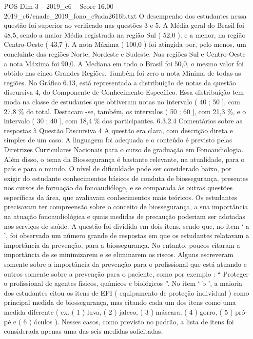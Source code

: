 \begin{textsample}{POS Dim 3 – 2019\_c6 – Score 16.00 – 2019\_c6/enade\_2019\_fono\_e9ada2616b.txt}
O desempenho dos estudantes nessa questão foi superior ao verificado nas questões 3 e 5.
A Média geral do Brasil foi 48,5, sendo a maior Média registrada na região Sul ( 52,0 ), e a menor, na região Centro-Oeste ( 43,7 ).
A nota Máxima ( 100,0 ) foi atingida por, pelo menos, um concluinte das regiões Norte, Nordeste e Sudeste.
Nas regiões Sul e Centro-Oeste a nota Máxima foi 90,0.
A Mediana em todo o Brasil foi 50,0, o mesmo valor foi obtido nas cinco Grandes Regiões.
Também foi zero a nota Mínima de todas as regiões.
No Gráfico 6.13, está representada a distribuição de notas da questão discursiva 4, do Componente de Conhecimento Específico.
Essa distribuição tem moda na classe de estudantes que obtiveram notas no intervalo ( 40 ; 50 ], com 27,8 \% do total.
Destacam -se, também, os intervalos ( 50 ; 60 ], com 21,3 \%, e o intervalo ( 30 ; 40 ], com 18,4 \% dos participantes. 6.3.2.4 Comentários sobre as respostas à Questão Discursiva 4 A questão era clara, com descrição direta e simples de um caso.
A linguagem foi adequada e o conteúdo é previsto pelas Diretrizes Curriculares Nacionais para o curso de graduação em Fonoaudiologia.
Além disso, o tema da Biossegurança é bastante relevante, na atualidade, para o país e para o mundo.
O nível de dificuldade pode ser considerado baixo, por exigir do estudante conhecimentos básicos de conduta de biossegurança, presentes nos cursos de formação do fonoaudiólogo, e se comparada às outras questões específicas da área, que avaliavam conhecimentos mais teóricos.
Os estudantes precisavam ter compreensão sobre o conceito de biossegurança, a sua importância na atuação fonoaudiológica e quais medidas de precaução poderiam ser adotadas nos serviços de saúde.
A questão foi dividida em dois itens, sendo que, no item ‘ a ’, foi observado um número grande de respostas em que os estudantes relatavam a importância da prevenção, para a biossegurança.
No entanto, poucos citaram a importância de se minimizarem e se eliminarem os riscos.
Alguns escreveram somente sobre a importância da prevenção para o profissional que está atuando e outros somente sobre a prevenção para o paciente, como por exemplo : “ Proteger o profissional de agentes físicos, químicos e biológicos ”.
No item ‘ b ’, a maioria dos estudantes citou os itens de EPI ( equipamento de proteção individual ) como principal medida de biossegurança, mas citando cada um dos itens como uma medida diferente ( ex. ( 1 ) luva, ( 2 ) jaleco, ( 3 ) máscara, ( 4 ) gorro, ( 5 ) pró-pé e ( 6 ) óculos ).
Nesses casos, como previsto no padrão, a lista de itens foi considerada apenas uma das seis medidas solicitadas.

\end{textsample}
